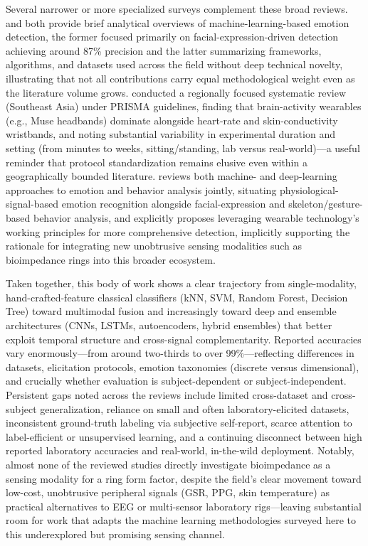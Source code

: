 Several narrower or more specialized surveys complement these broad reviews. \cite{sharma2023emotion} and \cite{shawon2024emotion} both provide brief analytical overviews of machine-learning-based emotion detection, the former focused primarily on facial-expression-driven detection achieving around 87\% precision and the latter summarizing frameworks, algorithms, and datasets used across the field without deep technical novelty, illustrating that not all contributions carry equal methodological weight even as the literature volume grows. \cite{destyanto2023emotion} conducted a regionally focused systematic review (Southeast Asia) under PRISMA guidelines, finding that brain-activity wearables (e.g., Muse headbands) dominate alongside heart-rate and skin-conductivity wristbands, and noting substantial variability in experimental duration and setting (from minutes to weeks, sitting/standing, lab versus real-world)---a useful reminder that protocol standardization remains elusive even within a geographically bounded literature. \cite{jinnuo2025analysis} reviews both machine- and deep-learning approaches to emotion and behavior analysis jointly, situating physiological-signal-based emotion recognition alongside facial-expression and skeleton/gesture-based behavior analysis, and explicitly proposes leveraging wearable technology's working principles for more comprehensive detection, implicitly supporting the rationale for integrating new unobtrusive sensing modalities such as bioimpedance rings into this broader ecosystem.

Taken together, this body of work shows a clear trajectory from single-modality, hand-crafted-feature classical classifiers (kNN, SVM, Random Forest, Decision Tree) toward multimodal fusion and increasingly toward deep and ensemble architectures (CNNs, LSTMs, autoencoders, hybrid ensembles) that better exploit temporal structure and cross-signal complementarity. Reported accuracies vary enormously---from around two-thirds to over 99\%---reflecting differences in datasets, elicitation protocols, emotion taxonomies (discrete versus dimensional), and crucially whether evaluation is subject-dependent or subject-independent. Persistent gaps noted across the reviews include limited cross-dataset and cross-subject generalization, reliance on small and often laboratory-elicited datasets, inconsistent ground-truth labeling via subjective self-report, scarce attention to label-efficient or unsupervised learning, and a continuing disconnect between high reported laboratory accuracies and real-world, in-the-wild deployment. Notably, almost none of the reviewed studies directly investigate bioimpedance as a sensing modality for a ring form factor, despite the field's clear movement toward low-cost, unobtrusive peripheral signals (GSR, PPG, skin temperature) as practical alternatives to EEG or multi-sensor laboratory rigs---leaving substantial room for work that adapts the machine learning methodologies surveyed here to this underexplored but promising sensing channel.

